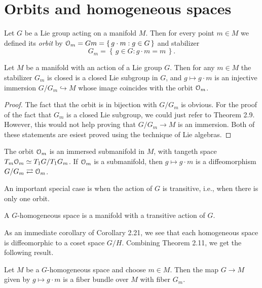\section{Orbits and homogeneous spaces}
Let $G$ be a Lie group acting on a manifold $M$. Then for every point
$m\in M$ we defined its \emph{orbit} by
$\mathcal{O}_m= Gm=\left\{\,g\cdot m:g\in G\,\right\}$ and
stabilizer
\[
G_m=\left\{\,g\in G:g\cdot m=m\,\right\}.
\]

\begin{theorem}
  Let $M$ be a manifold with an action of a Lie group $G$. Then for any
  $m\in M$ the stabilizer $G_m$ is closed is a closed Lie subgroup in $G$,
  and $g\mapsto g\cdot m$ is an injective immersion $G/G_m\hookrightarrow
  M$ whose image coincides with the orbit $\mathcal{O}_m$.
\end{theorem}

\begin{proof}
  The fact that the orbit is in bijection with $G/G_m$ is obvious. For the
  proof of the fact that $G_m$ is a closed Lie subgroup, we could just
  refer to Theorem 2.9. However, this would not help proving that
  $G/G_m\to M$ is an immersion. Both of these statements are esiest proved
  using the technique of Lie algebras.
\end{proof}

\begin{corollary}
  The orbit $\mathcal{O}_m$ is an immersed submanifold in $M$, with tangeth space
  $T_m\mathcal{O}_m\simeq T_1G/T_1G_m$. If $\mathcal{O}_m$ is a submanifold, then
  $g\mapsto g\cdot m$ is a diffeomorphism $G/G_m\rightleftarrows\mathcal{O}_m$.
\end{corollary}

An important special case is when the action of $G$ is transitive, i.e.,
when there is only one orbit.

\begin{definition}
  A $G$-homogeneous space is a manifold with a transitive action of $G$.
\end{definition}

As an immediate corollary of Corollary 2.21, we see that each homogeneous
space is diffeomorphic to a coset space $G/H$. Combining Theorem 2.11, we
get the following result.

\begin{corollary}
  Let $M$ be a $G$-homogeneous space and choose $m\in M$. Then the map
  $G\to M$ given by $g\mapsto g\cdot m$ is a fiber bundle over $M$ with
  fiber $G_m$.
\end{corollary}

